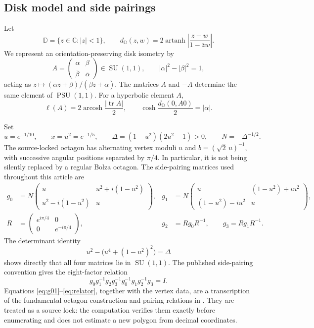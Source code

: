 \documentclass[11pt,a4paper]{article}
\theoremstyle{definition}
\newcommand{\D}{\mathbb D}
\newcommand{\C}{\mathbb C}
\newcommand{\PSU}{\operatorname{PSU}}
\newcommand{\SU}{\operatorname{SU}}
\newcommand{\tr}{\operatorname{tr}}
\newcommand{\arcosh}{\operatorname{arcosh}}
\newcommand{\length}{\ell}
\begin{document}
\subsection{Disk model and side pairings}

Let
\[
 \D=\{z\in\C:|z|<1\},\qquad
 d_{\D}(z,w)=2\operatorname{artanh}
 \left|\frac{z-w}{1-\overline z w}\right|.
\]
We represent an orientation-preserving disk isometry by
\[
 A=\begin{pmatrix}\alpha&\beta\\
 \overline\beta&\overline\alpha\end{pmatrix}\in\SU(1,1),
 \qquad |\alpha|^2-|\beta|^2=1,
\]
acting as \(z\mapsto(\alpha z+\beta)/(\overline\beta z+
\overline\alpha)\).  The matrices \(A\) and \(-A\) determine the same element
of \(\PSU(1,1)\).  For a hyperbolic element \(A\),
\begin{equation}\label{eq:length-trace}
 \length(A)=2\arcosh\frac{|\tr A|}{2},
 \qquad
 \cosh\frac{d_{\D}(0,A0)}{2}=|\alpha|.
\end{equation}

Set
\begin{equation}\label{eq:parameters}
 u=e^{-1/10},\qquad x=u^2=e^{-1/5},\qquad
 \Delta=(1-u^2)(2u^2-1)>0,
 \qquad N=-\Delta^{-1/2}.
\end{equation}
The source-locked octagon has alternating vertex moduli
\(u\) and \(b=(\sqrt2\,u)^{-1}\), with successive angular positions separated
by \(\pi/4\).  In particular, it is not being silently replaced by a regular
Bolza octagon.  The side-pairing matrices used throughout this article are
\begin{align}
 g_0&=N\begin{pmatrix}
 u&u^2+i(1-u^2)\\ u^2-i(1-u^2)&u
 \end{pmatrix},
 &
 g_1&=N\begin{pmatrix}
 u&(1-u^2)+iu^2\\ (1-u^2)-iu^2&u
 \end{pmatrix},\label{eq:g01}\\
 R&=\begin{pmatrix}e^{i\pi/4}&0\\0&e^{-i\pi/4}\end{pmatrix},
 &g_2&=Rg_0R^{-1},\qquad g_3=Rg_1R^{-1}.
 \label{eq:g23}
\end{align}
The determinant identity
\[
 u^2-\bigl(u^4+(1-u^2)^2\bigr)=\Delta
\]
shows directly that all four matrices lie in \(\SU(1,1)\).  The published
side-pairing convention gives the eight-factor relation
\begin{equation}\label{eq:relator}
 g_0g_1^{-1}g_2g_3^{-1}g_0^{-1}g_1g_2^{-1}g_3=I.
\end{equation}
Equations \eqref{eq:g01}--\eqref{eq:relator}, together with the vertex data,
are a transcription of the fundamental octagon construction and pairing
relations in \cite[eqs.~(10)--(18)]{Nazarenko2013}.  They are treated as a
source lock: the computation verifies them exactly before enumerating and
does not estimate a new polygon from decimal coordinates.
\end{document}
